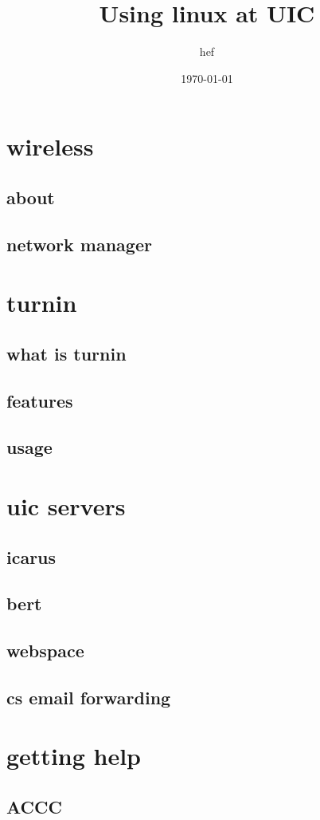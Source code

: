 \documentclass[hyperref={pdfpagelabels=false}]{beamer}
\title{Using linux at UIC}
\author{hef}
\date{\today}
\begin{document}
\frame{\titlepage}
\section[outline]{}
\frame{\tableofcontents}
\section{wireless}
\subsection{about}
\subsection{network manager}
\section{turnin}
\subsection{what is turnin}
\subsection{features}
\subsection{usage}
\section{uic servers}
\subsection{icarus}
\subsection{bert}
\subsection{webspace}
\subsection{cs email forwarding}
\section{getting help}
\subsection{ACCC}
\subsection{}
\end{document}

